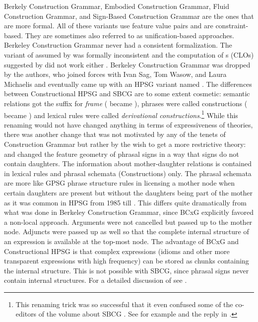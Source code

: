 \documentclass[output=paper]{langsci/langscibook}
\begin{document}
Berkely Construction Grammar, Embodied Construction Grammar, Fluid Construction Grammar, and
Sign-Based Construction Grammar are the ones that are more formal. All of these variants use feature
value pairs and are constraint-based. They are sometimes also referred to as unification-based
approaches. Berkeley Construction Grammar never had a consistent formalization. The variant of
 assumed by \citet{KF99a} was formally inconsistent \citep[Section~2.4]{Mueller2006d} and the computation of s (CLOs) suggested  by \citet{Kay2002a} did not work either \citep[Section~3]{Mueller2006d}. Berkeley Construction
Grammar was dropped by the authors, who joined forces with Ivan Sag, Tom Wasow, and Laura
Michaelis and eventually
came up with an HPSG variant named \sbcg{} \citep{Sag2012a}. The differences between
Constructional HPSG \citep{Sag97a} and SBCG are to some extent cosmetic: semantic relations got the
suffix  for \emph{frame} ( became ), phrases were called constructions ( became
) and lexical rules were called \emph{derivational constructions}.\footnote{
This renaming trick was so successful that it even confused some of the co-editors of the volume about
SBCG \citep{BS2012a-ed}. See for example  and the reply in .
}
While this renaming would not have changed anything in terms of expressiveness of theories, there
was another change that was not motivated by any of the tenets of Construction Grammar but rather by
the wish to get a more restrictive theory: \citet*{SWB2003a} and \citet{Sag2007a} changed the feature geometry of phrasal
signs in a way that signs do not contain daughters. The information about mother-daughter relations
is contained in lexical rules and phrasal schemata (Constructions) only. The phrasal schemata are
more like GPSG phrase structure rules in licensing a mother node when certain daughters are present
but without the daughters being part of the mother as it was common in HPSG from 1985 till
. This differs quite dramatically from what was done in Berkeley Construction
Grammar, since BCxG explicitly favored a non-local approach. Arguments were not cancelled but
passed up to the mother node. Adjuncts were passed up as well so that the complete internal
structure of an expression is available at the top-most node. The advantage of BCxG \citep*{FKoC88a} and
Constructional HPSG \citep{Sag97a} is that complex expressions (\eg idioms and other more transparent expressions
with high frequency) can be stored as chunks containing the internal structure. This is not possible
with SBCG, since phrasal signs never contain internal structures. For a detailed discussion of \sbcg
see .
\end{document}
